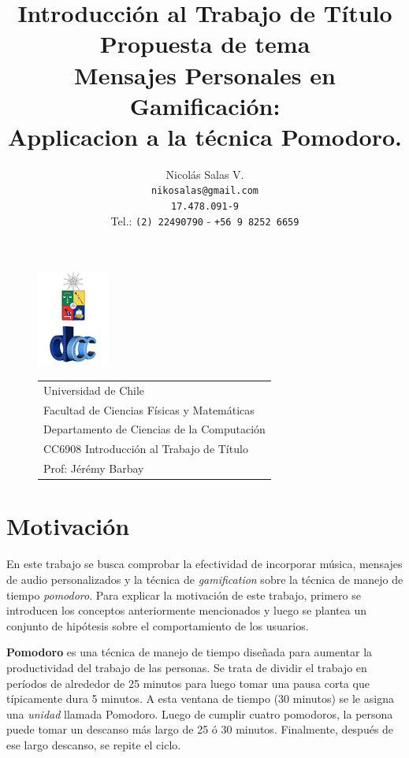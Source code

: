 \documentclass[12pt,letterpaper]{report}
\title{
{\small Introducción al Trabajo de Título \\  Propuesta de tema}
\\
{\Huge 
Mensajes Personales en Gamificación:\\
Applicacion a la técnica  Pomodoro.} 
}
\author{Nicolás Salas V.\\\texttt{nikosalas@gmail.com}\\\texttt{17.478.091-9}\\Tel.: \texttt{(2) 22490790} - \texttt{+56 9 8252 6659}}
\begin{document}
\begin{figure}[t]
\includegraphics[scale=0.83]{logo.png}
\begin{tabular}{l}
\small Universidad de Chile\\
\small Facultad de Ciencias Físicas y Matemáticas\\
\small Departamento de Ciencias de la Computación\\
\small CC6908 Introducción al Trabajo de Título\\
\small Prof: Jérémy Barbay
\vspace{2.3cm}
\end{tabular}
\end{figure}
\maketitle

\tableofcontents
\newpage

\hypertarget{motivaciuxf3n}{%
\section{Motivación}\label{motivaciuxf3n}}

En este trabajo se busca comprobar la efectividad de incorporar música,
mensajes de audio personalizados y la técnica de \emph{gamification}
sobre la técnica de manejo de tiempo \emph{pomodoro}. Para explicar la
motivación de este trabajo, primero se introducen los conceptos
anteriormente mencionados y luego se plantea un conjunto de hipótesis
sobre el comportamiento de los usuarios.

\textbf{Pomodoro}\cite{cirillo2009pomodoro} es una técnica de manejo de tiempo diseñada para
aumentar la productividad del trabajo de las personas. Se trata de
dividir el trabajo en períodos de alrededor de 25 minutos para luego
tomar una pausa corta que típicamente dura 5 minutos. A esta ventana de
tiempo (30 minutos) se le asigna una \emph{unidad} llamada Pomodoro.
Luego de cumplir cuatro pomodoros, la persona puede tomar un descanso
más largo de 25 ó 30 minutos. Finalmente, después de ese largo descanso,
se repite el ciclo.
\end{document}
